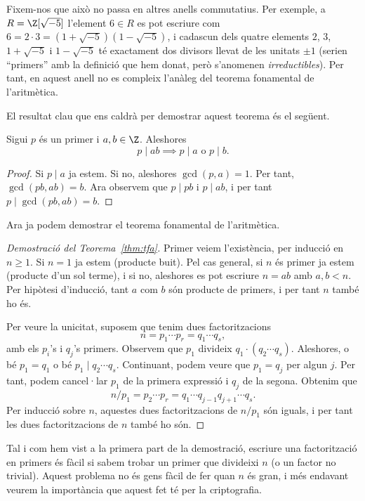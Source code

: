 \begin{remark}
Fixem-nos que això no passa en altres anells commutatius. Per exemple, a $R=\Z[\sqrt{-5}]$ l'element $6\in R$ es pot escriure com $6=2\cdot 3=(1+\sqrt{-5})(1-\sqrt{-5})$, i cadascun dels quatre elements $2$, $3$, $1+\sqrt{-5}$ i $1-\sqrt{-5}$ té exactament dos divisors llevat de les unitats $\pm 1$ (serien ``primers'' amb la definició que hem donat, però s'anomenen \emph{irreductibles}). Per tant, en aquest anell no es compleix l'anàleg del teorema fonamental de l'aritmètica.
\end{remark}

El resultat clau que ens caldrà per demostrar aquest teorema és el següent.
\begin{theorem}[Euclides]
\label{thm:Euclides-pab}
 Sigui $p$ és un primer i $a,b\in\Z$. Aleshores
 \[
 p\mid ab \implies p\mid a \text{ o } p \mid b.
\]
\end{theorem}
\begin{proof}
 Si $p\mid a$ ja estem. Si no, aleshores $\gcd(p,a)=1$. Per tant, $\gcd(pb,ab)=b$. Ara observem que $p\mid pb$ i $p\mid ab$, i per tant $p\mid \gcd(pb,ab)=b$.
\end{proof}

Ara ja podem demostrar el teorema fonamental de l'aritmètica.
\begin{proof}[Demostració del Teorema~\ref{thm:tfa}]
 Primer veiem l'existència, per inducció en $n\geq 1$. Si $n=1$ ja estem (producte buit). Pel cas general, si $n$ és primer ja estem (producte d'un sol terme), i si no, aleshores es pot escriure $n=ab$ amb $a,b < n$. Per hipòtesi d'inducció, tant $a$ com $b$ són producte de primers, i per tant $n$ també ho és.
 
 Per veure la unicitat, suposem que tenim dues factoritzacions
 \[
 n = p_1\cdots p_r = q_1\cdots q_s,
 \]
 amb els $p_i$'s i $q_j$'s primers. Observem que $p_1$ divideix $q_1\cdot(q_2\cdots q_s)$. Aleshores,  o bé $p_1=q_1$ o bé $p_1\mid q_2\cdots q_s$. Continuant, podem veure que $p_1 = q_j$ per algun $j$. Per tant, podem cancel·lar $p_1$ de la primera expressió i $q_j$ de la segona. Obtenim que
 \[
 n/p_1 = p_2\cdots p_r = q_1\cdots q_{j-1} q_{j+1}\cdots q_s.
 \]
 Per inducció sobre $n$, aquestes dues factoritzacions  de $n/p_1$ són iguals, i per tant les dues factoritzacions de $n$ també ho són.
\end{proof}

Tal i com hem vist a la primera part de la demostració, escriure una factorització en primers és fàcil si sabem trobar un primer que divideixi $n$ (o un factor no trivial). Aquest problema no és gens fàcil de fer quan $n$ és gran, i més endavant veurem la importància que aquest fet té per la criptografia.


